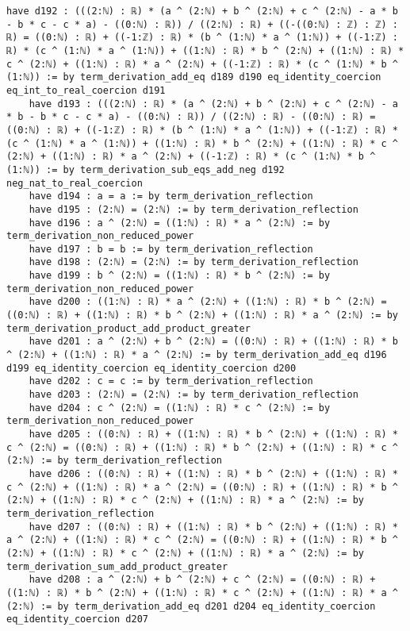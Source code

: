 \documentclass{article}
\begin{document}
\begin{tcolorbox}[colback=white!10, width=\linewidth]
\begin{lstlisting}[language=Lean4]
    have d192 : (((2:ℕ) : ℝ) * (a ^ (2:ℕ) + b ^ (2:ℕ) + c ^ (2:ℕ) - a * b - b * c - c * a) - ((0:ℕ) : ℝ)) / ((2:ℕ) : ℝ) + ((-((0:ℕ) : ℤ) : ℤ) : ℝ) = ((0:ℕ) : ℝ) + ((-1:ℤ) : ℝ) * (b ^ (1:ℕ) * a ^ (1:ℕ)) + ((-1:ℤ) : ℝ) * (c ^ (1:ℕ) * a ^ (1:ℕ)) + ((1:ℕ) : ℝ) * b ^ (2:ℕ) + ((1:ℕ) : ℝ) * c ^ (2:ℕ) + ((1:ℕ) : ℝ) * a ^ (2:ℕ) + ((-1:ℤ) : ℝ) * (c ^ (1:ℕ) * b ^ (1:ℕ)) := by term_derivation_add_eq d189 d190 eq_identity_coercion eq_int_to_real_coercion d191
    have d193 : (((2:ℕ) : ℝ) * (a ^ (2:ℕ) + b ^ (2:ℕ) + c ^ (2:ℕ) - a * b - b * c - c * a) - ((0:ℕ) : ℝ)) / ((2:ℕ) : ℝ) - ((0:ℕ) : ℝ) = ((0:ℕ) : ℝ) + ((-1:ℤ) : ℝ) * (b ^ (1:ℕ) * a ^ (1:ℕ)) + ((-1:ℤ) : ℝ) * (c ^ (1:ℕ) * a ^ (1:ℕ)) + ((1:ℕ) : ℝ) * b ^ (2:ℕ) + ((1:ℕ) : ℝ) * c ^ (2:ℕ) + ((1:ℕ) : ℝ) * a ^ (2:ℕ) + ((-1:ℤ) : ℝ) * (c ^ (1:ℕ) * b ^ (1:ℕ)) := by term_derivation_sub_eqs_add_neg d192 neg_nat_to_real_coercion
    have d194 : a = a := by term_derivation_reflection
    have d195 : (2:ℕ) = (2:ℕ) := by term_derivation_reflection
    have d196 : a ^ (2:ℕ) = ((1:ℕ) : ℝ) * a ^ (2:ℕ) := by term_derivation_non_reduced_power
    have d197 : b = b := by term_derivation_reflection
    have d198 : (2:ℕ) = (2:ℕ) := by term_derivation_reflection
    have d199 : b ^ (2:ℕ) = ((1:ℕ) : ℝ) * b ^ (2:ℕ) := by term_derivation_non_reduced_power
    have d200 : ((1:ℕ) : ℝ) * a ^ (2:ℕ) + ((1:ℕ) : ℝ) * b ^ (2:ℕ) = ((0:ℕ) : ℝ) + ((1:ℕ) : ℝ) * b ^ (2:ℕ) + ((1:ℕ) : ℝ) * a ^ (2:ℕ) := by term_derivation_product_add_product_greater
    have d201 : a ^ (2:ℕ) + b ^ (2:ℕ) = ((0:ℕ) : ℝ) + ((1:ℕ) : ℝ) * b ^ (2:ℕ) + ((1:ℕ) : ℝ) * a ^ (2:ℕ) := by term_derivation_add_eq d196 d199 eq_identity_coercion eq_identity_coercion d200
    have d202 : c = c := by term_derivation_reflection
    have d203 : (2:ℕ) = (2:ℕ) := by term_derivation_reflection
    have d204 : c ^ (2:ℕ) = ((1:ℕ) : ℝ) * c ^ (2:ℕ) := by term_derivation_non_reduced_power
    have d205 : ((0:ℕ) : ℝ) + ((1:ℕ) : ℝ) * b ^ (2:ℕ) + ((1:ℕ) : ℝ) * c ^ (2:ℕ) = ((0:ℕ) : ℝ) + ((1:ℕ) : ℝ) * b ^ (2:ℕ) + ((1:ℕ) : ℝ) * c ^ (2:ℕ) := by term_derivation_reflection
    have d206 : ((0:ℕ) : ℝ) + ((1:ℕ) : ℝ) * b ^ (2:ℕ) + ((1:ℕ) : ℝ) * c ^ (2:ℕ) + ((1:ℕ) : ℝ) * a ^ (2:ℕ) = ((0:ℕ) : ℝ) + ((1:ℕ) : ℝ) * b ^ (2:ℕ) + ((1:ℕ) : ℝ) * c ^ (2:ℕ) + ((1:ℕ) : ℝ) * a ^ (2:ℕ) := by term_derivation_reflection
    have d207 : ((0:ℕ) : ℝ) + ((1:ℕ) : ℝ) * b ^ (2:ℕ) + ((1:ℕ) : ℝ) * a ^ (2:ℕ) + ((1:ℕ) : ℝ) * c ^ (2:ℕ) = ((0:ℕ) : ℝ) + ((1:ℕ) : ℝ) * b ^ (2:ℕ) + ((1:ℕ) : ℝ) * c ^ (2:ℕ) + ((1:ℕ) : ℝ) * a ^ (2:ℕ) := by term_derivation_sum_add_product_greater
    have d208 : a ^ (2:ℕ) + b ^ (2:ℕ) + c ^ (2:ℕ) = ((0:ℕ) : ℝ) + ((1:ℕ) : ℝ) * b ^ (2:ℕ) + ((1:ℕ) : ℝ) * c ^ (2:ℕ) + ((1:ℕ) : ℝ) * a ^ (2:ℕ) := by term_derivation_add_eq d201 d204 eq_identity_coercion eq_identity_coercion d207

\end{lstlisting}
\end{tcolorbox}
\end{document}
